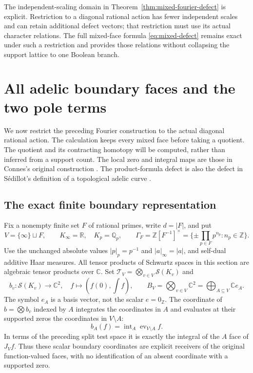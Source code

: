 \documentclass[11pt,a4paper]{article}
\theoremstyle{definition}\newtheorem{definition}[theorem]{Definition}
\newcommand{\Z}{\mathbb Z}\newcommand{\Q}{\mathbb Q}
\newcommand{\C}{\mathbb C}\newcommand{\R}{\mathbb R}
\newcommand{\Sch}{\mathcal S}\newcommand{\im}{\operatorname{im}}
\begin{document}
The independent-scaling domain in Theorem~\ref{thm:mixed-fourier-defect} is explicit. Restriction to a diagonal rational action has fewer independent scales and can retain additional defect vectors; that restriction must use its actual character relations. The full mixed-face formula \eqref{eq:mixed-defect} remains exact under such a restriction and provides those relations without collapsing the support lattice to one Boolean branch.



\section{All adelic boundary faces and the two pole terms}
\label{sec:adelic-boundary}
We now restrict the preceding Fourier construction to the actual diagonal
rational action. The calculation keeps every mixed face before taking a
quotient. The quotient and its contracting homotopy will be computed, rather
than inferred from a support count. The local zero and integral maps are those
in Connes's original construction \cite[Section III, (6)--(11)]{Connes1998}.
The product-formula defect is also the defect in S\'edillot's definition of a
topological adelic curve \cite[\texttt{def:topological\_adelic\_curve}]{Sedillot}.

\subsection{The exact finite boundary representation}
Fix a nonempty finite set $F$ of rational primes, write $d=|F|$, and put
\[
 V=\{\infty\}\sqcup F,\qquad K_\infty=\R,\quad K_p=\Q_p,
 \qquad \Gamma_F=\Z[F^{-1}]^\times
 =\{\pm\prod_{p\in F}p^{n_p}:n_p\in\Z\}.
 \tag{AB1}
\]
Use the unchanged absolute values $|p|_p=p^{-1}$ and $|a|_\infty=|a|$,
and self-dual additive Haar measures. All tensor products of Schwartz spaces
in this section are algebraic tensor products over $\C$.
Set $\mathcal T_V=\bigotimes_{v\in V}\Sch(K_v)$ and
\[
 b_v:\Sch(K_v)\longrightarrow\C^2,\quad
 f\longmapsto(f(0),\int f),\qquad
 B_V=\bigotimes_{v\in V}\C^2=\bigoplus_{A\subseteq V}\C e_A.
 \tag{AB2}
\]
The symbol $e_A$ is a basis vector, not the scalar $e=0_\Z$.
The coordinate of $b=\bigotimes b_v$ indexed by $A$ integrates the coordinates
in $A$ and evaluates at their supported zeros the coordinates in $V\setminus A$:
\[
 b_A(f)=\operatorname{int}_A\operatorname{ev}_{V\setminus A}f.
 \tag{AB3}
\]
In terms of the preceding split test space it is exactly the integral of the
$A$ face of $J_Vf$. Thus these scalar boundary coordinates are explicit
receivers of the original function-valued faces, with no identification of
an absent coordinate with a supported zero.
\end{document}
